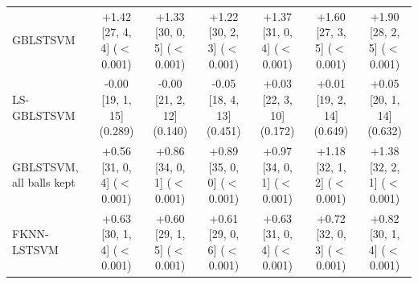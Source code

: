 \begin{table}[!t]
{\begin{tabular}{lcccccc}
GBLSTSVM & \shortstack{+1.42 [27, 4, 4]\\($<$0.001)} & \shortstack{+1.33 [30, 0, 5]\\($<$0.001)} & \shortstack{+1.22 [30, 2, 3]\\($<$0.001)} & \shortstack{+1.37 [31, 0, 4]\\($<$0.001)} & \shortstack{+1.60 [27, 3, 5]\\($<$0.001)} & \shortstack{+1.90 [28, 2, 5]\\($<$0.001)} \\[4pt]
LS-GBLSTSVM & \shortstack{-0.00 [19, 1, 15]\\(0.289)} & \shortstack{-0.00 [21, 2, 12]\\(0.140)} & \shortstack{-0.05 [18, 4, 13]\\(0.451)} & \shortstack{+0.03 [22, 3, 10]\\(0.172)} & \shortstack{+0.01 [19, 2, 14]\\(0.649)} & \shortstack{+0.05 [20, 1, 14]\\(0.632)} \\[4pt]
GBLSTSVM, all balls kept & \shortstack{+0.56 [31, 0, 4]\\($<$0.001)} & \shortstack{+0.86 [34, 0, 1]\\($<$0.001)} & \shortstack{+0.89 [35, 0, 0]\\($<$0.001)} & \shortstack{+0.97 [34, 0, 1]\\($<$0.001)} & \shortstack{+1.18 [32, 1, 2]\\($<$0.001)} & \shortstack{+1.38 [32, 2, 1]\\($<$0.001)} \\[4pt]
FKNN-LSTSVM & \shortstack{+0.63 [30, 1, 4]\\($<$0.001)} & \shortstack{+0.60 [29, 1, 5]\\($<$0.001)} & \shortstack{+0.61 [29, 0, 6]\\($<$0.001)} & \shortstack{+0.63 [31, 0, 4]\\($<$0.001)} & \shortstack{+0.72 [32, 0, 3]\\($<$0.001)} & \shortstack{+0.82 [30, 1, 4]\\($<$0.001)} \\[4pt]
\bottomrule
\end{tabular}}
\end{table}
